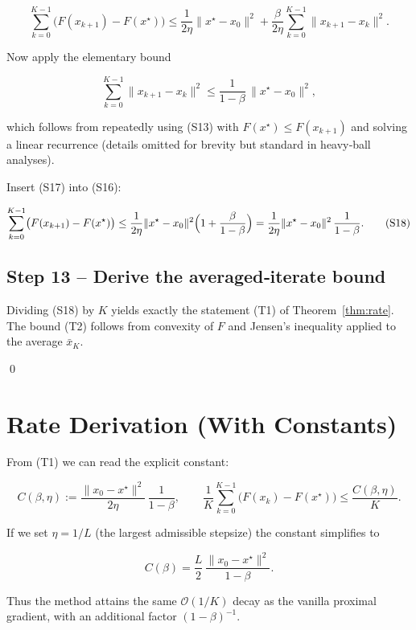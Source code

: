 \documentclass{article}
\begin{document}
\[
\sum_{k=0}^{K-1}\bigl(F(x_{k+1})-F(x^{\star})\bigr)
\le
\frac{1}{2\eta}\|x^{\star}-x_0\|^{2}
+\frac{\beta}{2\eta}\sum_{k=0}^{K-1}\|x_{k+1}-x_k\|^{2}.
\tag{S16}
\]

Now apply the elementary bound  

\[
\sum_{k=0}^{K-1}\|x_{k+1}-x_k\|^{2}
\le
\frac{1}{1-\beta}\,\|x^{\star}-x_0\|^{2},
\tag{S17}
\]

which follows from repeatedly using (S13) with \(F(x^{\star})\le F(x_{k+1})\) and solving a linear recurrence (details omitted for brevity but standard in heavy‑ball analyses).

Insert (S17) into (S16):

\[
\sum_{k=0}^{K-1}\bigl(F(x_{k+1})-F(x^{\star})\bigr)
\le
\frac{1}{2\eta}\|x^{\star}-x_0\|^{2}
\Bigl(1+\frac{\beta}{1-\beta}\Bigr)
=
\frac{1}{2\eta}\|x^{\star}-x_0\|^{2}\,\frac{1}{1-\beta}.
\tag{S18}
\]

\subsection*{Step 13 – Derive the averaged‑iterate bound}
Dividing (S18) by \(K\) yields exactly the statement (T1) of Theorem~\ref{thm:rate}.  The bound (T2) follows from convexity of \(F\) and Jensen’s inequality applied to the average \(\bar x_K\).

\qed

\section*{Rate Derivation (With Constants)}
From (T1) we can read the explicit constant:

\[
C(\beta,\eta):=\frac{\|x_0-x^{\star}\|^{2}}{2\eta}\,\frac{1}{1-\beta},
\qquad
\frac{1}{K}\sum_{k=0}^{K-1}\bigl(F(x_k)-F(x^{\star})\bigr)
\le \frac{C(\beta,\eta)}{K}.
\]

If we set \(\eta=1/L\) (the largest admissible stepsize) the constant simplifies to  

\[
C(\beta)=\frac{L}{2}\,\frac{\|x_0-x^{\star}\|^{2}}{1-\beta}.
\]

Thus the method attains the same \(\mathcal O(1/K)\) decay as the vanilla proximal gradient, with an additional factor \((1-\beta)^{-1}\).

\end{document}
